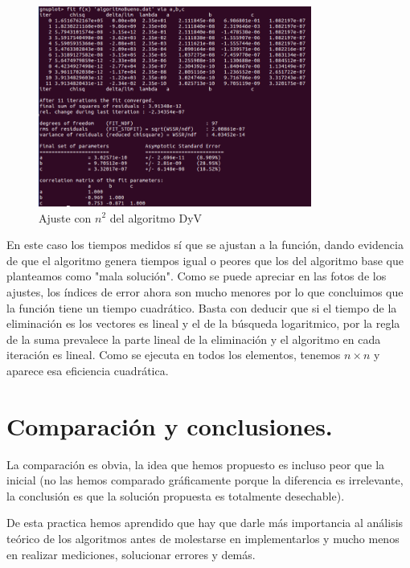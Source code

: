 \documentclass[a4paper, 11pt]{article}
\begin{document}
\begin{figure}[!htp]
	\includegraphics[width=0.8\textwidth]{dyvajuste2.png}
	\caption{Ajuste con $n^2$ del algoritmo DyV	\label{AJuste2}}
\end{figure}

En este caso los tiempos medidos sí que se ajustan a la función, dando evidencia de que el algoritmo genera tiempos igual o peores que los del algoritmo base que planteamos como "mala solución". Como se puede apreciar en las fotos de los ajustes, los índices de error ahora son mucho menores por lo que concluimos que la función tiene un tiempo cuadrático. Basta con deducir que si el tiempo de la eliminación es los vectores es lineal y el de la búsqueda logaritmico, por la regla de la suma prevalece la parte lineal de la eliminación y el algoritmo en cada iteración es lineal. Como se ejecuta en todos los elementos, tenemos $n\times n$ y aparece esa eficiencia cuadrática.

\section{Comparación y conclusiones.}
La comparación es obvia, la idea que hemos propuesto es incluso peor que la inicial (no las hemos comparado gráficamente porque la diferencia es irrelevante, la conclusión es que la solución propuesta es totalmente desechable).

De esta practica hemos aprendido que hay que darle más importancia al análisis teórico de los algoritmos antes de molestarse en implementarlos y mucho menos en realizar mediciones, solucionar errores y demás.
\end{document}
